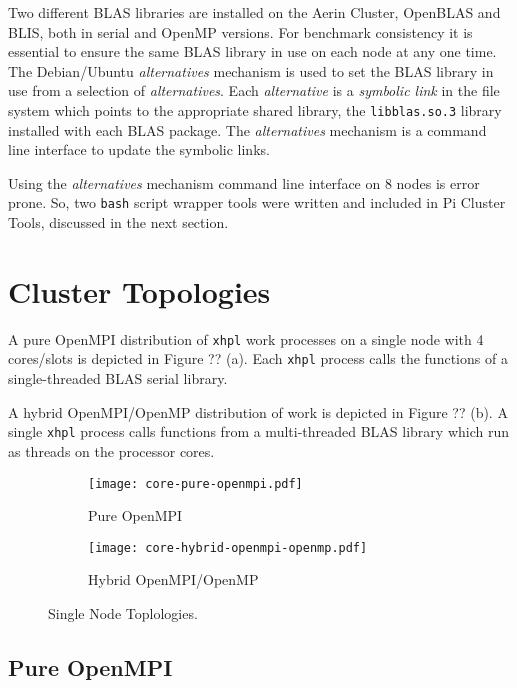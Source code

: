 Two different BLAS libraries are installed on the Aerin Cluster, OpenBLAS and BLIS, both in serial and OpenMP versions. For benchmark consistency it is essential to ensure the same BLAS library in use on each node at any one time. The Debian/Ubuntu \emph{alternatives} mechanism is used to set the BLAS library in use from a selection of \emph{alternatives}. Each \emph{alternative} is a \emph{symbolic link} in the file system which points to the appropriate shared library, the \verb|libblas.so.3| library installed with each BLAS package. The \emph{alternatives} mechanism is a command line interface to update the symbolic links.

Using the \emph{alternatives} mechanism command line interface on 8 nodes is error prone. So, two \verb|bash| script wrapper tools were written and included in Pi Cluster Tools, discussed in the next section.


%
%
\section{Cluster Topologies}

A pure OpenMPI distribution of \verb|xhpl| work processes on a single node with 4 cores/slots is depicted in Figure ?? (a). Each \verb|xhpl| process calls the functions of a single-threaded BLAS serial library.

A hybrid OpenMPI/OpenMP distribution of work is depicted in Figure ?? (b). A single \verb|xhpl| process calls functions from a multi-threaded BLAS library which run as threads on the processor cores.

\begin{figure}
	\begin{subfigure}{1.0\textwidth}
		\centering
		\texttt{[image: core-pure-openmpi.pdf]}
		\caption{Pure OpenMPI}
		\label{fig:subim1}
	\end{subfigure}
	\par\bigskip
	\begin{subfigure}{1.0\textwidth}
		\centering
		\texttt{[image: core-hybrid-openmpi-openmp.pdf]}
		\caption{Hybrid OpenMPI/OpenMP}
		\label{fig:subim2}
	\end{subfigure}
\caption{Single Node Toplologies.}
\label{fig:image2}
\end{figure}


%
%
\subsection{Pure OpenMPI}

